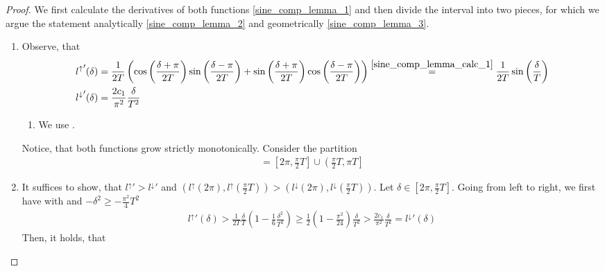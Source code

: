 \sinecomplemma*\label{sine_comp_lemma_proof}

\begin{proof}
    We first calculate the derivatives of both functions \ref{sine_comp_lemma_1} and then divide the interval into two pieces, for which we argue the statement analytically \ref{sine_comp_lemma_2} and geometrically \ref{sine_comp_lemma_3}.

    \begin{enumerate}[label=(\roman*)]
        \item \label{sine_comp_lemma_1} Observe, that
        \begin{align}
            {l^\uparrow}'(\delta) &= \frac{1}{2T}\left(\cos\left(\frac{\delta+\pi}{2T}\right)\sin\left(\frac{\delta-\pi}{2T}\right)+\sin\left(\frac{\delta+\pi}{2T}\right)\cos\left(\frac{\delta-\pi}{2T}\right)\right) \overset{\ref{sine_comp_lemma_calc_1}}{=} \frac{1}{2T}\sin\left(\frac{\delta}{T}\right) \label{l_functions_derivatives_1}\\
            {l^\downarrow}'(\delta) &= \frac{2c_1}{\pi^2}\frac{\delta}{T^2}
        \end{align}
        \begin{enumerate}[label=(\arabic*), wide]
            \item We use . \label{sine_comp_lemma_calc_1}
        \end{enumerate}
        Notice, that both functions grow strictly monotonically. Consider the partition
        \begin{align}
            [2 \pi, \pi T] = \left[2\pi, \frac{\pi}{2}T\right] \cup \left(\frac{\pi}{2}T, \pi T\right]
        \end{align}
        \item \label{sine_comp_lemma_2} It suffices to show, that \({l^\uparrow}' > {l^\downarrow}'\) and \(\left(l^\uparrow(2\pi), l^\uparrow\left(\frac{\pi}{2}T\right)\right) > \left(l^\downarrow(2\pi), l^\downarrow\left(\frac{\pi}{2}T\right)\right)\). Let \(\delta \in \left[2 \pi, \frac{\pi}{2}T\right]\). Going from left to right, we first have with  and \(-\delta^2 \geq -\frac{\pi^2}{4}T^2\)
        \begin{align}
            {l^\uparrow}'(\delta) > \frac{1}{2T}\frac{\delta}{T}\left(1-\frac{1}{6}\frac{\delta^2}{T^2}\right) \geq \frac{1}{2}\left(1-\frac{\pi^2}{24}\right)\frac{\delta}{T^2} > \frac{2c_1}{\pi^2}\frac{\delta}{T^2} = {l^\downarrow}'(\delta)
        \end{align}
        Then, it holds, that

\end{enumerate}
\end{proof}
